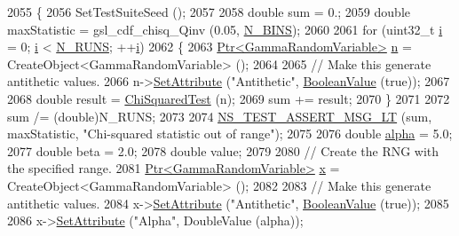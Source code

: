 \begin{DoxyCode}
2055 \{
2056   SetTestSuiteSeed ();
2057 
2058   \textcolor{keywordtype}{double} sum = 0.;
2059   \textcolor{keywordtype}{double} maxStatistic = gsl\_cdf\_chisq\_Qinv (0.05, \hyperlink{classRandomVariableStreamGammaAntitheticTestCase_a53782cd4dda85815c519f356800b2193}{N\_BINS});
2060 
2061   \textcolor{keywordflow}{for} (uint32\_t \hyperlink{bernuolliDistribution_8m_a6f6ccfcf58b31cb6412107d9d5281426}{i} = 0; \hyperlink{bernuolliDistribution_8m_a6f6ccfcf58b31cb6412107d9d5281426}{i} < \hyperlink{classRandomVariableStreamGammaAntitheticTestCase_aab2dfb293b0566a23871559a28617bab}{N\_RUNS}; ++\hyperlink{bernuolliDistribution_8m_a6f6ccfcf58b31cb6412107d9d5281426}{i})
2062     \{
2063       \hyperlink{classns3_1_1Ptr}{Ptr<GammaRandomVariable>} \hyperlink{namespacesample-rng-plot_aeb5ee5c431e338ef39b7ac5431242e1d}{n} = CreateObject<GammaRandomVariable> ();
2064 
2065       \textcolor{comment}{// Make this generate antithetic values.}
2066       n->\hyperlink{classns3_1_1ObjectBase_ac60245d3ea4123bbc9b1d391f1f6592f}{SetAttribute} (\textcolor{stringliteral}{"Antithetic"}, \hyperlink{classns3_1_1BooleanValue}{BooleanValue} (\textcolor{keyword}{true}));
2067 
2068       \textcolor{keywordtype}{double} result = \hyperlink{classRandomVariableStreamGammaAntitheticTestCase_a51540f4a36a6c9c9fdc81f95fde0224f}{ChiSquaredTest} (n);
2069       sum += result;
2070     \}
2071 
2072   sum /= (double)N\_RUNS;
2073 
2074   \hyperlink{group__testing_ga1d96848b91407c9a0b36583e8b0ad7ae}{NS\_TEST\_ASSERT\_MSG\_LT} (sum, maxStatistic, \textcolor{stringliteral}{"Chi-squared statistic out of range"});
2075 
2076   \textcolor{keywordtype}{double} \hyperlink{lte__uplink__power__control_8m_a62197192f0fbf4e0675eb37be1c4c175}{alpha} = 5.0;
2077   \textcolor{keywordtype}{double} beta = 2.0;
2078   \textcolor{keywordtype}{double} value;
2079 
2080   \textcolor{comment}{// Create the RNG with the specified range.}
2081   \hyperlink{classns3_1_1Ptr}{Ptr<GammaRandomVariable>} \hyperlink{lte__link__budget__x2__handover__measures_8m_a9336ebf25087d91c818ee6e9ec29f8c1}{x} = CreateObject<GammaRandomVariable> ();
2082 
2083   \textcolor{comment}{// Make this generate antithetic values.}
2084   x->\hyperlink{classns3_1_1ObjectBase_ac60245d3ea4123bbc9b1d391f1f6592f}{SetAttribute} (\textcolor{stringliteral}{"Antithetic"}, \hyperlink{classns3_1_1BooleanValue}{BooleanValue} (\textcolor{keyword}{true}));
2085 
2086   x->\hyperlink{classns3_1_1ObjectBase_ac60245d3ea4123bbc9b1d391f1f6592f}{SetAttribute} (\textcolor{stringliteral}{"Alpha"}, DoubleValue (alpha));

\end{DoxyCode}
